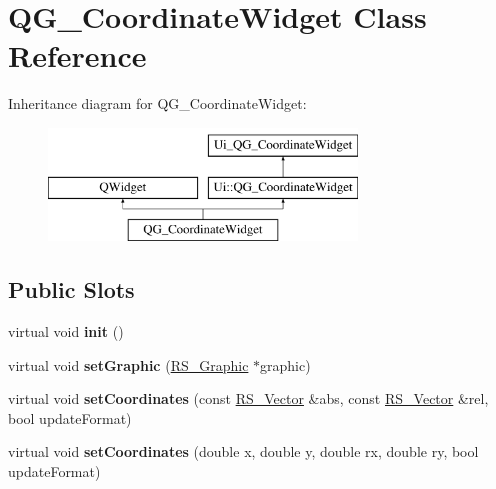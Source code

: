 \hypertarget{classQG__CoordinateWidget}{\section{Q\-G\-\_\-\-Coordinate\-Widget Class Reference}
\label{classQG__CoordinateWidget}
}
Inheritance diagram for Q\-G\-\_\-\-Coordinate\-Widget\-:\begin{figure}[H]
\begin{center}
\leavevmode
\includegraphics[height=3.000000cm]{classQG__CoordinateWidget}
\end{center}
\end{figure}
\subsection*{Public Slots}
\begin{DoxyCompactItemize}
\item 
\hypertarget{classQG__CoordinateWidget_a85728dfb473d117e3e7c36e247d685e0}{virtual void {\bfseries init} ()}\label{classQG__CoordinateWidget_a85728dfb473d117e3e7c36e247d685e0}

\item 
\hypertarget{classQG__CoordinateWidget_a31602bf4c6a54d1075b8bc31309cba56}{virtual void {\bfseries set\-Graphic} (\hyperlink{classRS__Graphic}{R\-S\-\_\-\-Graphic} $\ast$graphic)}\label{classQG__CoordinateWidget_a31602bf4c6a54d1075b8bc31309cba56}

\item 
\hypertarget{classQG__CoordinateWidget_a9b722b646dcba07235ecee3f0fb7f293}{virtual void {\bfseries set\-Coordinates} (const \hyperlink{classRS__Vector}{R\-S\-\_\-\-Vector} \&abs, const \hyperlink{classRS__Vector}{R\-S\-\_\-\-Vector} \&rel, bool update\-Format)}\label{classQG__CoordinateWidget_a9b722b646dcba07235ecee3f0fb7f293}

\item 
\hypertarget{classQG__CoordinateWidget_a78f2a41af3fd4d4a09b1e3326886f7cf}{virtual void {\bfseries set\-Coordinates} (double x, double y, double rx, double ry, bool update\-Format)}\label{classQG__CoordinateWidget_a78f2a41af3fd4d4a09b1e3326886f7cf}

\end{DoxyCompactItemize}
